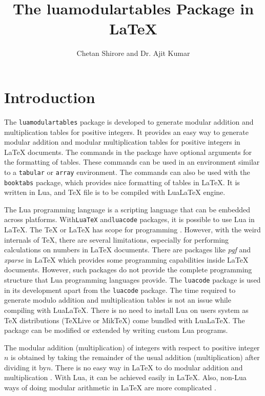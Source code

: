 ﻿\documentclass{article}
\begin{document}
\title{The luamodulartables Package in LaTeX}
\author{Chetan Shirore and Dr. Ajit Kumar}
\maketitle
\section{Introduction}\label{section:introduction}
The \verb|luamodulartables| package is developed to generate modular addition and multiplication tables for positive integers. It provides an easy way to generate modular addition and modular multiplication tables for positive integers in LaTeX documents. The commands in the package have optional arguments for the formatting of tables. These commands can be used in an environment similar to a  \verb|tabular| or \verb|array| environment. The commands can also be used with the \verb|booktabs| package, which provides nice formatting of tables in LaTeX. It is written in Lua, and TeX file is to be compiled with LuaLaTeX engine.


The Lua \cite{online.luaorg} programming language is a scripting language that can be embedded across platforms. With\verb|LuaTeX| \cite{online.luatex}  and\verb|luacode| \cite{online.luacode} packages, it is possible to use Lua in LaTeX. The TeX  \cite{online.tex} or LaTeX has scope for programming \cite{online.texscript}. However, with the weird internals of TeX, there are several limitations, especially for performing calculations on numbers in LaTeX documents. There are packages like \emph{pgf} \cite{online.pgf} and  \emph{xparse}  \cite{online.xparse} in LaTeX which provides some programming capabilities inside LaTeX documents. However, such packages do not provide the complete programming structure that Lua programming languages provide. The \verb|luacode| \cite{online.luacode}  package is used in its development apart from the \verb|luacode| package. The time required to generate modulo addition and multiplication tables is not an issue while compiling with LuaLaTeX. There is no need to install Lua on users system as TeX distributions (TeXLive or MikTeX) come bundled with LuaLaTeX. The package can be modified or extended by writing custom Lua programs.

The modular addition (multiplication) of integers with respect to positive integer \(n\) is obtained by taking the remainder of the usual addition (multiplication) after dividing it by\(n\). There is no easy way in LaTeX to do modular addition and multiplication \cite{online.modularithmetic}. With Lua, it can be achieved easily in LaTeX. Also, non-Lua ways of doing modular arithmetic in LaTeX are more complicated  \cite{online.modularithmetic2}.
\end{document}
